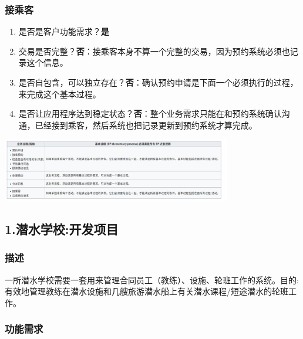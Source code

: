 \hypertarget{ux63a5ux4e58ux5ba2}{%
\subsubsection{接乘客}\label{ux63a5ux4e58ux5ba2}}

\begin{enumerate}
\tightlist
\item
  是否是客户功能需求？\textbf{是}
\item
  交易是否完整？\textbf{否}：接乘客本身不算一个完整的交易，因为预约系统必须也记录这个信息。
\item
  是否自包含，可以独立存在？\textbf{否}：确认预约申请是下面一个必须执行的过程，来完成这个基本过程。
\item
  是否让应用程序达到稳定状态？\textbf{否}：整个业务需求只能在和预约系统确认沟通，已经接到乘客，然后系统也把记录更新到预约系统才算完成。
\end{enumerate}


\includegraphics[width=10cm]{Screenshotfrom2022122020-34-37.png}


\hypertarget{ux4e0eux56fdux9645ux529fux80fdux70b9ifpugux7684ux504fux5dee}{%
\subsection{1.潜水学校:开发项目 }\label{ux4e0eux56fdux9645ux529fux80fdux70b9ifpugux7684ux504fux5dee}}

\hypertarget{ux63a5ux4e58ux5ba2}{%
\subsubsection{描述}\label{ux63a5ux4e58ux5ba2}}

一所潜水学校需要一套用来管理合同员工（教练）、设施、轮班工作的系统。目的:有效地管理教练在潜水设施和几艘旅游潜水船上有关潜水课程/短途潜水的轮班工作。 \\
\hypertarget{ux63a5ux4e58ux5ba2}{%
\subsubsection{功能需求}\label{ux63a5ux4e58ux5ba2}}

